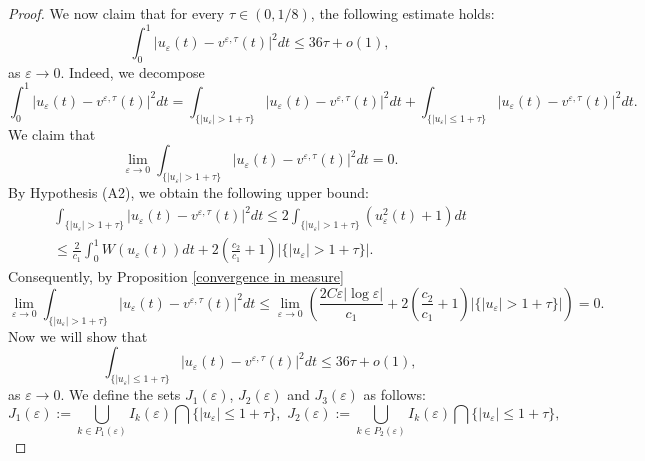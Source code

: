 \documentclass[12pt]{article}
\numberwithin{equation}{section}
\begin{document}
\begin{proof}
We now claim that for every $\tau \in (0,1/8)$, the following estimate holds:
\begin{equation}\label{36tau}
    \int_{0}^{1}\left|u_{\varepsilon}(t)-v^{\varepsilon,\tau}(t)\right|^2dt\le36\tau+o(1),
\end{equation}
as $\varepsilon\to0$. Indeed, we decompose 
\begin{equation*}
    \int_{0}^{1}\left|u_{\varepsilon}(t)-v^{\varepsilon,\tau}(t)\right|^2dt=\int_{\{\left|u_{\varepsilon}\right|>1+\tau\}}\left|u_{\varepsilon}(t)-v^{\varepsilon,\tau}(t)\right|^2dt+\int_{\{\left|u_{\varepsilon}\right|\le1+\tau\}}\left|u_{\varepsilon}(t)-v^{\varepsilon,\tau}(t)\right|^2dt.
\end{equation*}
We claim that 
\[
\lim_{\varepsilon\to0}\int_{\{\left|u_{\varepsilon}\right|>1+\tau\}}\left|u_{\varepsilon}(t)-v^{\varepsilon,\tau}(t)\right|^2dt=0.
\]
By Hypothesis {\rm (A2)}, we obtain the following upper bound:
\begin{align*}
    \int_{\{\left|u_{\varepsilon}\right|>1+\tau\}}\left|u_{\varepsilon}(t)-v^{\varepsilon,\tau}(t)\right|^2dt\le2\int_{\{\left|u_{\varepsilon}\right|>1+\tau\}}(u^{2}_{\varepsilon}(t)+1)dt\\
\le\frac{2}{c_{1}}\int_{0}^{1}W(u_{\varepsilon}(t))dt+2\left(\frac{c_{2}}{c_{1}}+1\right)|\{\left|u_{\varepsilon}\right|>1+\tau\}|.
\end{align*}
Consequently, by Proposition \ref{convergence in measure}
\[
\lim_{\varepsilon\to0}\int_{\{\left|u_{\varepsilon}\right|>1+\tau\}}\left|u_{\varepsilon}(t)-v^{\varepsilon,\tau}(t)\right|^2dt\le\lim_{\varepsilon\to0}\left(\frac{2C\varepsilon|\log{\varepsilon}|}{c_{1}}+2\left(\frac{c_{2}}{c_{1}}+1\right)|\{\left|u_{\varepsilon}\right|>1+\tau\}|\right)=0.
\]
Now we will show that
\[
\int_{\{\left|u_{\varepsilon}\right|\le1+\tau\}}\left|u_{\varepsilon}(t)-v^{\varepsilon,\tau}(t)\right|^2dt\le 36\tau+o(1),
\]
as $\varepsilon\to0$. We define the sets $J_1(\varepsilon)$, $J_2(\varepsilon)$ and $J_3(\varepsilon)$ as follows:
\begin{equation*}
    J_{1}(\varepsilon):=\bigcup_{k\in P_{1}(\varepsilon)}I_{k}(\varepsilon)\bigcap \{\left|u_{\varepsilon}\right|\le{1+\tau\}},\,\,J_{2}(\varepsilon):=\bigcup_{k\in P_{2}(\varepsilon)}I_{k}(\varepsilon)\bigcap \{\left|u_{\varepsilon}\right|\le{1+\tau\}},
\end{equation*}

\end{proof}
\end{document}
